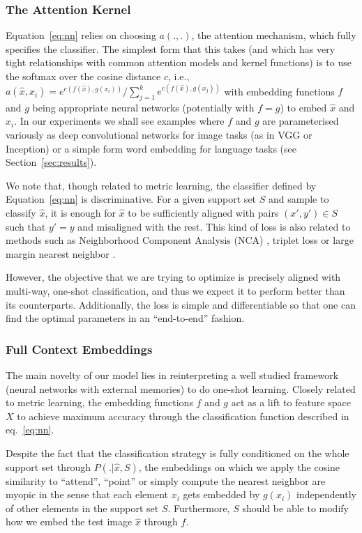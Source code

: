 \subsubsection{The Attention Kernel}
Equation~\ref{eq:nn} relies on choosing $a(.,.)$, the attention mechanism, which fully specifies the classifier. The simplest form that this takes (and which has very tight relationships with common attention models and kernel functions) is to use the softmax over the cosine distance $c$, i.e., 
$a(\hat{x},x_i) = e^{c(f(\hat{x}),g(x_i))} / \sum_{j=1}^k e^{c(f(\hat{x}),g(x_j))}$
with embedding functions $f$ and $g$ being appropriate neural networks (potentially with $f=g$) to embed $\hat{x}$ and $x_i$.
In our experiments we shall see examples where $f$ and $g$ are parameterised variously as deep convolutional networks for image tasks (as in VGG\cite{simonyan2014very} or Inception\cite{szegedy2015going}) or a simple form word embedding for language tasks (see Section~\ref{sec:results}).

We note that, though related to metric learning, the classifier defined by Equation~\ref{eq:nn} is discriminative. For a given support set $S$ and sample to classify $\hat{x}$, it is enough for $\hat{x}$ to be sufficiently aligned with pairs $(x',y') \in S$ such that $y'=y$ and misaligned with the rest. This kind of loss is also related to methods such as Neighborhood Component Analysis (NCA) \cite{nca}, triplet loss \cite{hoffer2015deep} or large margin nearest neighbor \cite{weinberger2009distance}.

However, the objective that we are trying to optimize is precisely aligned with multi-way, one-shot classification, and thus we expect it to perform better than its counterparts.
Additionally, the loss is simple and differentiable so that one can find the optimal parameters in an ``end-to-end'' fashion.

\subsubsection{Full Context Embeddings}
\label{sec:fce}
The main novelty of our model lies in reinterpreting a well studied framework (neural networks with external memories) to do one-shot learning. Closely related to metric learning, the embedding functions $f$ and $g$ act as a lift to feature space $X$ to achieve maximum accuracy through the classification function described in eq.~\ref{eq:nn}.

Despite the fact that the classification strategy is fully conditioned on the whole support set through $P(.|\hat{x},S)$, the embeddings on which we apply the cosine similarity to ``attend'', ``point'' or simply compute the nearest neighbor are myopic in the sense that each element $x_i$ gets embedded by $g(x_i)$ independently of other elements in the support set $S$. Furthermore, $S$ should be able to modify how we embed the test image $\hat{x}$ through $f$.

